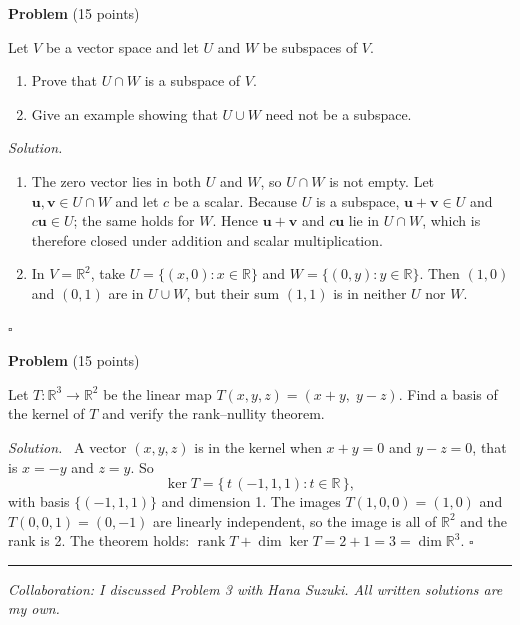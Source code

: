 \documentclass[11pt,a4paper]{article}
\newcounter{problem}
\newcommand{\problem}[1]{\stepcounter{problem}\bigskip\noindent\textbf{Problem \theproblem} \textnormal{(#1 points)}\par\nopagebreak}
\newenvironment{solution}{\par\noindent\textit{Solution.}\ }{\hfill$\square$\par}
\begin{document}
\problem{15}
Let $V$ be a vector space and let $U$ and $W$ be subspaces of $V$.
\begin{enumerate}[label=(\alph*)]
  \item Prove that $U \cap W$ is a subspace of $V$.
  \item Give an example showing that $U \cup W$ need not be a subspace.
\end{enumerate}

\begin{solution}
\begin{enumerate}[label=(\alph*)]
  \item The zero vector lies in both $U$ and $W$, so $U \cap W$ is not empty. Let $\mathbf{u}, \mathbf{v} \in U \cap W$ and let $c$ be a scalar. Because $U$ is a subspace, $\mathbf{u} + \mathbf{v} \in U$ and $c\mathbf{u} \in U$; the same holds for $W$. Hence $\mathbf{u} + \mathbf{v}$ and $c\mathbf{u}$ lie in $U \cap W$, which is therefore closed under addition and scalar multiplication.
  \item In $V = \mathbb{R}^2$, take $U = \{(x, 0) : x \in \mathbb{R}\}$ and $W = \{(0, y) : y \in \mathbb{R}\}$. Then $(1, 0)$ and $(0, 1)$ are in $U \cup W$, but their sum $(1, 1)$ is in neither $U$ nor $W$.
\end{enumerate}
\end{solution}

\problem{15}
Let $T \colon \mathbb{R}^3 \to \mathbb{R}^2$ be the linear map $T(x, y, z) = (x + y,\; y - z)$. Find a basis of the kernel of $T$ and verify the rank--nullity theorem.

\begin{solution}
A vector $(x, y, z)$ is in the kernel when $x + y = 0$ and $y - z = 0$, that is $x = -y$ and $z = y$. So
\[
  \ker T = \{\, t\,(-1, 1, 1) : t \in \mathbb{R} \,\},
\]
with basis $\{(-1, 1, 1)\}$ and dimension 1. The images $T(1, 0, 0) = (1, 0)$ and $T(0, 0, 1) = (0, -1)$ are linearly independent, so the image is all of $\mathbb{R}^2$ and the rank is 2. The theorem holds: $\operatorname{rank} T + \dim \ker T = 2 + 1 = 3 = \dim \mathbb{R}^3$.
\end{solution}

\bigskip
\hrule
\smallskip
\textit{Collaboration: I discussed Problem 3 with Hana Suzuki. All written solutions are my own.}
\end{document}
